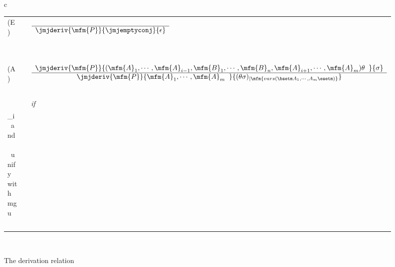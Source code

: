  \begin{figure}[t]
%
\begin{center}
\begin{tabular}{c}  
%
\begin{tabular}{lll}
\\
  (E) & \hspace*{2ex} &
   $\begin{array}{c}
      \\ 
         \hline 
         \jmjderiv{ \mfm{P} }{ \jmjemptyconj }{ \epsilon }
   \end{array}$
\\ \mbox{ } 
\\  \mbox{ } 
\\
  (A) & \hspace*{2ex} &
   $\begin{array}{c}
         \jmjderiv{ 
                     \mfm{P} 
                  }{
                     ( \mfm{A}_{1}, \cdots, \mfm{A}_{i-1},
                       \mfm{B}_{1}, \cdots, \mfm{B}_{n},
                       \mfm{A}_{i+1}, \cdots, \mfm{A}_{m} ) \theta
                       \; \; 
                  }{
                     \sigma
                   }
      \\ \hline 
         \jmjderiv{ 
                     \mfm{P} 
                  }{ 
                     \mfm{A}_{1}, \cdots, \mfm{A}_{m}
                     \; \;
                  }{
                     (\theta\sigma)_{\mid \mfm{ 
                               vars( \bsetm A_{1},\cdots,A_{m} \esetm ) }}
                   }
   \end{array}$
\\ \mbox{ }
\\ & & 
\hspace*{6ex} {\em if } 
\( \begin{system}{l}
      ( \mfm{H} \leftarrow \mfm{B}_{1}, \cdots, \mfm{B}_{n} ) 
      \mbox{ is a fresh renaming of a clause in } \mfm{P} 
      \\
      \mfm{A}_{i} \mbox{ and } \mfm{H} \mbox{ unify with mgu } \theta
\end{system} \)
\\  \mbox{ }
\\  
\end{tabular}
%
\\
\end{tabular}
\end{center}
%
\caption{The derivation relation
\label{jmj-figderiv}}
\end{figure}

